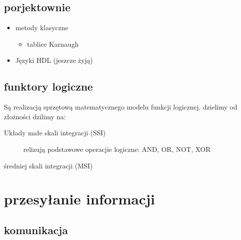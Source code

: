 \documentclass[11pt]{article}
\begin{document}
\subsection{porjektownie}
\label{sec:orgfd8823e}
\begin{itemize}
\item metody klasyczne
\begin{itemize}
\item tablice Karnaugh
\end{itemize}
\item Języki HDL
(jeszcze żyją)
\end{itemize}
\subsection{funktory logiczne}
\label{sec:orgc90b691}
Są realizacją sprzętową matematycznego modelu funkcji logicznej.
dzielimy od złożności dzilimy na:
\begin{description}
\item[{Układy małe skali integracji (SSI)}] relizują podstawowe operacjie logiczne: AND, OR, NOT, XOR
\item[{średniej skali integracji (MSI)}] 
\end{description}
\section{przesyłanie informacji}
\label{sec:orgc8cd0a1}
\subsection{komunikacja}
\label{sec:org7ac4f78}
\end{document}
